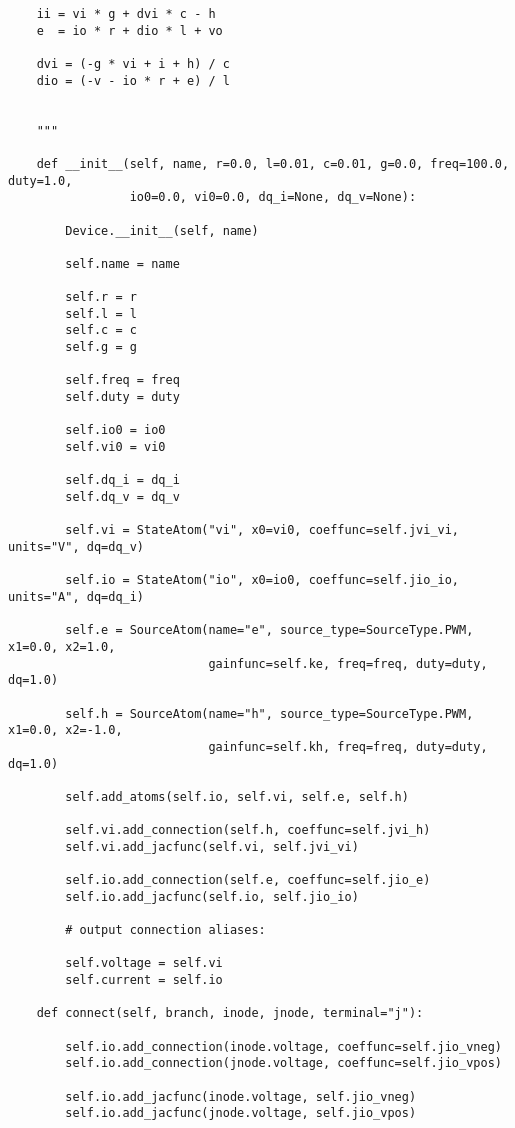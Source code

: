 \begin{lstlisting}
    ii = vi * g + dvi * c - h
    e  = io * r + dio * l + vo

    dvi = (-g * vi + i + h) / c
    dio = (-v - io * r + e) / l


    """

    def __init__(self, name, r=0.0, l=0.01, c=0.01, g=0.0, freq=100.0, duty=1.0,
                 io0=0.0, vi0=0.0, dq_i=None, dq_v=None):

        Device.__init__(self, name)

        self.name = name

        self.r = r
        self.l = l
        self.c = c
        self.g = g

        self.freq = freq
        self.duty = duty

        self.io0 = io0
        self.vi0 = vi0

        self.dq_i = dq_i
        self.dq_v = dq_v

        self.vi = StateAtom("vi", x0=vi0, coeffunc=self.jvi_vi, units="V", dq=dq_v)

        self.io = StateAtom("io", x0=io0, coeffunc=self.jio_io, units="A", dq=dq_i)

        self.e = SourceAtom(name="e", source_type=SourceType.PWM, x1=0.0, x2=1.0,
                            gainfunc=self.ke, freq=freq, duty=duty, dq=1.0)

        self.h = SourceAtom(name="h", source_type=SourceType.PWM, x1=0.0, x2=-1.0,
                            gainfunc=self.kh, freq=freq, duty=duty, dq=1.0)

        self.add_atoms(self.io, self.vi, self.e, self.h)

        self.vi.add_connection(self.h, coeffunc=self.jvi_h)
        self.vi.add_jacfunc(self.vi, self.jvi_vi)

        self.io.add_connection(self.e, coeffunc=self.jio_e)
        self.io.add_jacfunc(self.io, self.jio_io)

        # output connection aliases:

        self.voltage = self.vi
        self.current = self.io

    def connect(self, branch, inode, jnode, terminal="j"):

        self.io.add_connection(inode.voltage, coeffunc=self.jio_vneg)
        self.io.add_connection(jnode.voltage, coeffunc=self.jio_vpos)

        self.io.add_jacfunc(inode.voltage, self.jio_vneg)
        self.io.add_jacfunc(jnode.voltage, self.jio_vpos)


\end{lstlisting}
